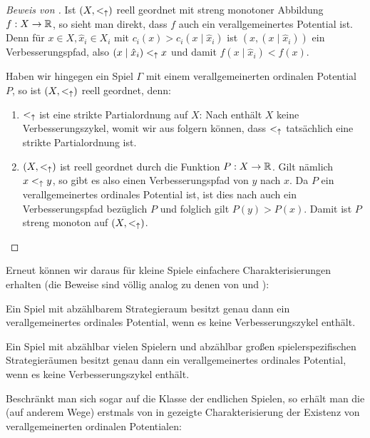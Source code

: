 \begin{proof}[Beweis von ]
	Ist $(X, <_\uparrow)$ reell geordnet mit streng monotoner Abbildung $f: X \to \mathbb{R}$, so sieht man direkt, dass $f$ auch ein verallgemeinertes Potential ist. Denn für $x \in X, \hat{x}_i \in X_i$ mit $c_i(x) > c_i(x \mid \hat{x}_i)$ ist $(x, (x \mid \hat{x}_i))$ ein Verbesserungspfad, also $(x \mid \hat{x}_i) <_\uparrow x$ und damit $f(x \mid \hat{x}_i) < f(x)$.
	
	Haben wir hingegen ein Spiel $\Gamma$ mit einem verallgemeinerten ordinalen Potential $P$, so ist $(X, <_\uparrow)$ reell geordnet, denn:
	\begin{enumerate}
		\item $<_\uparrow$ ist eine strikte Partialordnung auf $X$: Nach  enthält $X$ keine Verbesserungszykel, womit wir aus  folgern können, dass $<_\uparrow$ tatsächlich eine strikte Partialordnung ist.
		\item $(X, <_\uparrow)$ ist reell geordnet durch die Funktion $P: X \to \mathbb{R}$. Gilt nämlich $x <_\uparrow y$, so gibt es also einen Verbesserungspfad von $y$ nach $x$. Da $P$ ein verallgemeinertes ordinales Potential ist, ist dies nach  auch ein Verbesserungspfad bezüglich $P$ und folglich gilt $P(y) > P(x)$. Damit ist $P$ streng monoton auf $(X, <_\uparrow)$. \qedhere
	\end{enumerate} 
\end{proof}

Erneut können wir daraus für \glqq kleine\grqq{} Spiele einfachere Charakterisierungen erhalten (die Beweise sind völlig analog zu denen von  und ):

\begin{kor}\label{kor:CharExVerOrdPotabzX}
	Ein Spiel mit abzählbarem Strategieraum besitzt genau dann ein verallgemeinertes ordinales Potential, wenn es keine Verbesserungszykel enthält.
\end{kor}

\begin{kor}\label{kor:CharExVerOrdPotabzIundXi}
	Ein Spiel mit abzählbar vielen Spielern und abzählbar großen spielerspezifischen Strategieräumen besitzt genau dann ein verallgemeinertes ordinales Potential, wenn es keine Verbesserungszykel enthält.
\end{kor}

Beschränkt man sich sogar auf die Klasse der endlichen Spielen, so erhält man die (auf anderem Wege) erstmals von \citeauthor{MonShap} in \cite[Lemma 2.5]{MonShap} gezeigte Charakterisierung der Existenz von verallgemeinerten ordinalen Potentialen:

